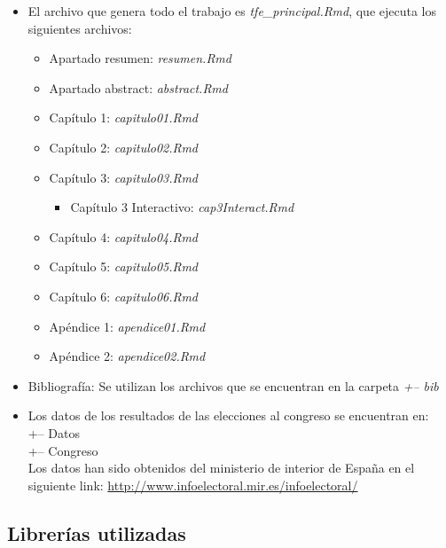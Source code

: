 \documentclass[12pt,a4paper,]{book}
\providecommand{\tightlist}{%
  \setlength{\itemsep}{0pt}\setlength{\parskip}{0pt}}
\numberwithin{dummy}{section}
\theoremstyle{ocrenumbox}
\theoremstyle{blacknumex}
\theoremstyle{blacknumbox}
\theoremstyle{ocrenum}
\theoremstyle{ocrenum}
\begin{document}
\begin{itemize}
\item
  El archivo que genera todo el trabajo es \emph{tfe\_principal.Rmd},
  que ejecuta los siguientes archivos:

  \begin{itemize}
  \tightlist
  \item
    Apartado resumen: \emph{resumen.Rmd}
  \item
    Apartado abstract: \emph{abstract.Rmd}
  \item
    Capítulo 1: \emph{capitulo01.Rmd}
  \item
    Capítulo 2: \emph{capitulo02.Rmd}
  \item
    Capítulo 3: \emph{capitulo03.Rmd}

    \begin{itemize}
    \tightlist
    \item
      Capítulo 3 Interactivo: \emph{cap3Interact.Rmd}
    \end{itemize}
  \item
    Capítulo 4: \emph{capitulo04.Rmd}
  \item
    Capítulo 5: \emph{capitulo05.Rmd}
  \item
    Capítulo 6: \emph{capitulo06.Rmd}
  \item
    Apéndice 1: \emph{apendice01.Rmd}
  \item
    Apéndice 2: \emph{apendice02.Rmd}
  \end{itemize}
\item
  Bibliografía: Se utilizan los archivos que se encuentran en la carpeta
  \emph{+-- bib}
\item
  Los datos de los resultados de las elecciones al congreso se
  encuentran en:\\
  +-- Datos\\
  \textbar{} +-- Congreso\\
  Los datos han sido obtenidos del ministerio de interior de España en
  el siguiente link:
  \url{http://www.infoelectoral.mir.es/infoelectoral/}
\end{itemize}

\hypertarget{libreruxedas-utilizadas}{%
\subsection{Librerías utilizadas}\label{libreruxedas-utilizadas}}
\end{document}
